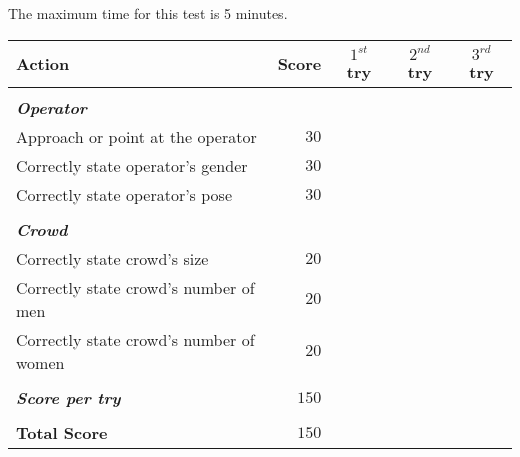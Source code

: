 The maximum time for this test is 5 minutes.

\begin{tabularx}{\textwidth}{X r c c c }

	\textbf{Action} & \textbf{Score} & \textbf{$1^{st}$ try} & \textbf{$2^{nd}$ try} & \textbf{$3^{rd}$ try} \\ \hline
	& & & & \\ 
	\textit{\textbf{Operator}} \\
	Approach or point at the operator & $30$ & \hrulefill & \hrulefill & \hrulefill \\
	Correctly state operator's gender & $30$ & \hrulefill & \hrulefill & \hrulefill \\
	Correctly state operator's pose & $30$ & \hrulefill & \hrulefill & \hrulefill \\
	& & & & \\ 
	\textit{\textbf{Crowd}} \\
	Correctly state crowd's size & $20$ & \hrulefill & \hrulefill & \hrulefill \\
	Correctly state crowd's number of men & $20$ & \hrulefill & \hrulefill & \hrulefill \\
	Correctly state crowd's number of women & $20$ & \hrulefill & \hrulefill & \hrulefill \\ \hline
	& & & & \\ 
	\textit{\textbf{Score per try}} & $150$ & \hrulefill & \hrulefill & \hrulefill \\ 
	& & & & \\ 
	\textbf{Total Score} & $150$ & & & \\ \cline{3-5}

\end{tabularx}\\


